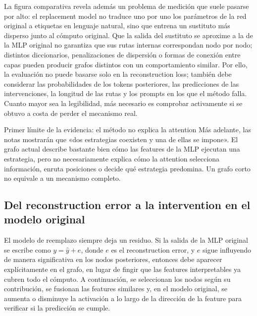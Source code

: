 \documentclass[a4paper]{article}
\begin{document}
La figura comparativa revela además un problema de medición que suele pasarse por alto: el replacement model no traduce uno por uno los parámetros de la red original a etiquetas en lenguaje natural, sino que entrena un sustituto más disperso junto al cómputo original. Que la salida del sustituto se aproxime a la de la MLP original no garantiza que sus rutas internas correspondan nodo por nodo; distintos diccionarios, penalizaciones de dispersión o formas de conexión entre capas pueden producir grafos distintos con un comportamiento similar. Por ello, la evaluación no puede basarse solo en la reconstruction loss; también debe considerar las probabilidades de los tokens posteriores, las predicciones de las intervenciones, la longitud de las rutas y los prompts en los que el método falla. Cuanto mayor sea la legibilidad, más necesario es comprobar activamente si se obtuvo a costa de perder el mecanismo real.

\begin{warningbox}{Primer límite de la evidencia: el método no explica la attention}
Más adelante, las notas mostrarán que «dos estrategias coexisten y una de ellas se impone». El grafo actual describe bastante bien cómo las features de la MLP ejecutan una estrategia, pero no necesariamente explica cómo la attention selecciona información, enruta posiciones o decide qué estrategia predomina. Un grafo corto no equivale a un mecanismo completo.
\end{warningbox}


\subsection{Del reconstruction error a la intervention en el modelo original}

El modelo de reemplazo siempre deja un residuo. Si la salida de la MLP original se escribe como $y=\hat y+e$, donde $e$ es el reconstruction error, y $e$ sigue influyendo de manera significativa en los nodos posteriores, entonces debe aparecer explícitamente en el grafo, en lugar de fingir que las features interpretables ya cubren todo el cómputo. A continuación, se seleccionan los nodos según su contribución, se fusionan las features similares y, en el modelo original, se aumenta o disminuye la activación a lo largo de la dirección de la feature para verificar si la predicción se cumple.
\end{document}
